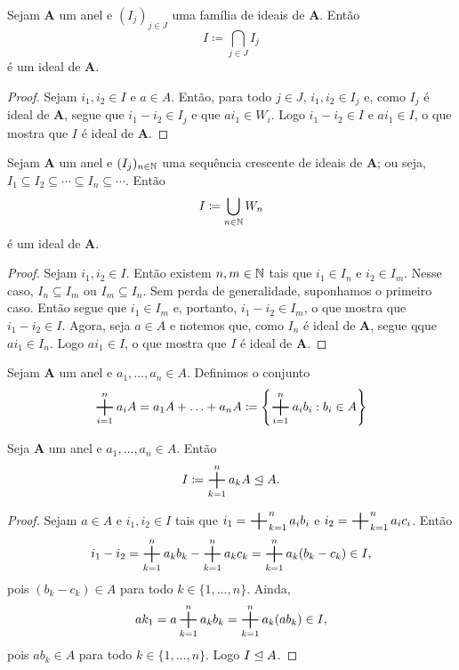 \begin{prop}
	Sejam $\bm A$ um anel e $(I_j)_{j \in J}$ uma família de ideais de $\bm A$. Então
	\begin{equation*}
	I \coloneqq \bigcap_{j \in J} I_j
	\end{equation*}
é um ideal de $\bm A$.
\end{prop}
\begin{proof}
	Sejam $i_1,i_2 \in I$ e $a \in A$. Então, para todo $j \in J$, $i_1,i_2 \in I_j$ e, como $I_j$ é ideal de $\bm A$, segue que $i_1-i_2 \in I_j$ e que $ai_1 \in W_i$. Logo $i_1-i_2 \in I$ e $ai_1 \in I$, o que mostra que $I$ é ideal de $\bm A$.
\end{proof}

\begin{prop}
	Sejam $\bm A$ um anel e $(I_j)_{n \in \mathbb{N}}$ uma sequência crescente de ideais de $\bm A$; ou seja, $I_1 \subseteq I_2 \subseteq \cdots \subseteq I_n \subseteq \cdots$. Então
	\begin{equation*}
	I \coloneqq \bigcup_{n \in \mathbb{N}} W_n
	\end{equation*}
é um ideal de $\bm A$.
\end{prop}
\begin{proof}
	Sejam $i_1,i_2 \in I$. Então existem $n,m \in \mathbb{N}$ tais que $i_1 \in I_n$ e $i_2 \in I_m$. Nesse caso, $I_n \subseteq I_m$ ou $I_m \subseteq I_n$. Sem perda de generalidade, suponhamos o primeiro caso. Então segue que $i_1 \in I_m$ e, portanto, $i_1-i_2 \in I_m$, o que mostra que $i_1-i_2 \in I$. Agora, seja $a \in A$ e notemos que, como $I_n$ é ideal de $\bm A$, segue qque $ai_1 \in I_n$. Logo $ai_1 \in I$, o que mostra que $I$ é ideal de $\bm A$.
\end{proof}


\begin{defi}
	Sejam $\bm A$ um anel e $a_1,\ldots,a_n \in A$. Definimos o conjunto
	\begin{equation*}
	\bigsum_{i=1}^n a_iA = a_1A + \ldots + a_nA \coloneqq \left\{\bigsum_{i=1}^n a_ib_i : b_i \in A\right\}
	\end{equation*}
\end{defi}

\begin{prop}
	Seja $\bm A$ um anel e $a_1,\ldots,a_n \in A$. Então
	\begin{equation*}
	I \coloneqq \bigsum_{k=1}^n a_kA \ide A.
	\end{equation*}
\end{prop}
\begin{proof}
	Sejam $a \in A$ e $i_1,i_2 \in I$ tais que $i_1=\bigsum_{k=1}^n a_ib_i$ e $i_2=\bigsum_{k=1}^n a_ic_i$. Então
	\begin{equation*}
	i_1-i_2=\bigsum_{k=1}^n a_kb_k - \bigsum_{k=1}^n a_kc_k = \bigsum_{k=1}^n a_k(b_k-c_k) \in I,
	\end{equation*}
pois $(b_k-c_k) \in A$ para todo $k \in \{1,\ldots,n\}$. Ainda,
	\begin{equation*}
	ak_1=a\bigsum_{k=1}^n a_kb_k= \bigsum_{k=1}^n a_k(ab_k) \in I,
	\end{equation*}
pois $ab_k \in A$ para todo $k \in \{1,\ldots,n\}$. Logo $I \mathrel{\unlhd} A$.
\end{proof}

